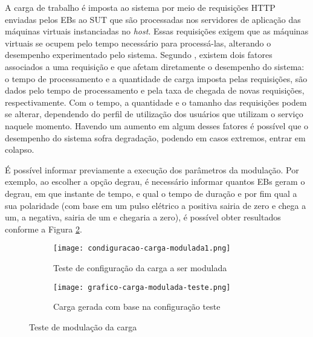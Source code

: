 A carga de trabalho é imposta ao sistema por meio de requisições HTTP enviadas pelos EBs ao SUT que são processadas nos servidores de aplicação das máquinas virtuais instanciadas no \textit{host}. Essas requisições exigem que as máquinas virtuais se ocupem pelo tempo necessário para processá-las, alterando o desempenho experimentado pelo sistema.
Segundo , existem dois fatores associados a uma requisição e que afetam diretamente o desempenho do sistema:
o tempo de processamento e a quantidade de carga imposta pelas requisições, são dados pelo tempo de processamento e pela taxa de chegada de novas requisições, respectivamente. Com o tempo, a quantidade e o tamanho das requisições podem se alterar, dependendo do perfil de utilização dos usuários que utilizam o serviço naquele momento. Havendo um aumento em algum desses fatores é possível que o desempenho do sistema sofra degradação, podendo em casos extremos, entrar em colapso.

É possível informar previamente a execução dos parâmetros da modulação. Por exemplo, ao escolher a opção degrau, é necessário informar quantos EBs geram o degrau, em que instante de tempo, e qual o tempo de duração e por fim qual a sua polaridade (com base em um pulso elétrico a positiva sairia de zero e chega a um, a negativa, sairia de um e chegaria a zero), é possível obter resultados conforme a Figura \ref{fig:grafico-carga-modulada-teste}.

\begin{figure}[!htb]
	\centering
	\begin{subfigure}{\linewidth}
		\centering
		\texttt{[image: condiguracao-carga-modulada1.png]}
		\caption{Teste de configuração da carga a ser modulada}
		\label{fig:configuracao-carga-modulada-teste}
	\end{subfigure}
	
	\begin{subfigure}{\linewidth}
		\centering
		\texttt{[image: grafico-carga-modulada-teste.png]}
		\caption{Carga gerada com base na configuração teste}
		\label{fig:grafico-carga-modulada-teste}
	\end{subfigure}  
	\caption{Teste de modulação da carga}  
	\label{fig:carga-modulada-teste}
	\fautor
\end{figure}  

